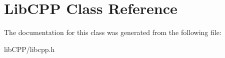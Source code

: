 \hypertarget{classLibCPP}{\section{Lib\-C\-P\-P Class Reference}
\label{classLibCPP}
}


The documentation for this class was generated from the following file\-:\begin{DoxyCompactItemize}
\item 
lib\-C\-P\-P/libcpp.\-h\end{DoxyCompactItemize}
